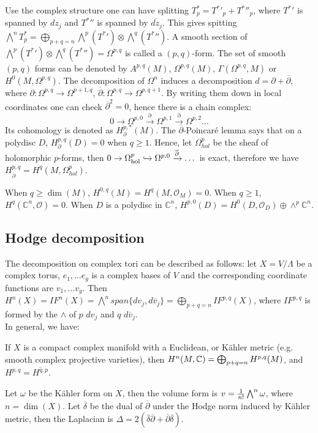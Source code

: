 Use the complex structure one can have splitting $T^*_p={T^*}'_p+{T^*}{''}_p$, where ${T^*}'$ is spanned by $dz_j$ and ${T^*}{''}$ is spanned by $\overline{dz_j}$. This gives spitting $\bigwedge^nT^*_p=\bigoplus_{p+q=n}\bigwedge^p({T^*}')\otimes \bigwedge^q({T^*}{''})$. A smooth section of $\bigwedge^p({T^*}')\otimes \bigwedge^q({T^*}{''})=\Omega^{p,q}$ is called a $(p,q)$-form. The set of smooth $(p,q)$ forms can be denoted by $A^{p,q}(M)$, $\Omega^{p,q}(M)$, $\Gamma(\Omega^{p,q},M)$ or $H^0(M,\Omega^{p,q})$. The decomposition of $\Omega^n$ induces a decomposition $d=\partial+\overline{\partial}$, where $\partial: \Omega^{p,q}\rightarrow\Omega^{p+1,q}$, $\overline{\partial}:\Omega^{p,q}\rightarrow\Omega^{p,q+1}$. By writing them down in local coordinates one can check $\overline{\partial}^2=0$, hence there is a chain complex:
$$0\rightarrow\Omega^{p,0}\xrightarrow{\partial}\Omega^{p,1}\xrightarrow{\partial}\Omega^{p,2}\dots$$
Its cohomology is denoted as $H^{p,*}_\partial(M)$. 
The $\overline{\partial}$-Poincar\'e lemma says that on a polydisc $D$, $H^{p,q}_\partial(D)=0$ when $q\geq 1$. Hence, let $\Omega^p_{hol}$ be the sheaf of holomorphic $p$-forms, then $0 \rightarrow\Omega^p_{\rm hol} \xhookrightarrow{}\Omega^{p,0} \xrightarrow{\overline{\partial}}\dots$ is exact, therefore we have $H^{p,q}_{\overline{\partial}}=H^q(M,\Omega^p_{hol})$. \\

\begin{example}
When $q\geq\dim(M)$, $H^{0,q}(M)=H^q(M,\mathcal{O}_M)=0$. When $q\geq 1$, $H^q(\mathbb{C}^n,\mathcal{O})=0$. When $D$ is a polydisc in $\mathbb{C}^n$, $H^{p,0}(D)=H^0(D,\mathcal{O}_D)\oplus\wedge^p\mathbb{C}^n$. 	
\end{example}

\subsection{Hodge decomposition}
The decomposition on complex tori can be described as follows: let $X=V/\Lambda$ be a complex torus, $e_1,\dots e_g$ is a complex bases of $V$ and the corresponding coordinate functions are $v_1,\dots v_g$. Then $H^n(X)=IF^n(X)=\bigwedge^n span\{dv_j,d\overline{v}_j\}=\bigoplus_{p+q=n}IF^{p,q}(X)$, where $IF^{p,q}$ is formed by the $\wedge$ of $p$ $dv_j$ and $q$ $d\overline{v}_j$.\\
 
In general, we have: 
\begin{theorem}
	If $X$ is a compact complex manifold with a Euclidean, or K\"ahler metric (e.g. smooth complex projective varieties), then $H^n(M , {\mathbb C})=\bigoplus_{p+q=n}H^{p,q}(M)$, and $H^{p,q}=\overline{H^{q,p}}$.
\end{theorem}

Let $\omega$ be the K\"ahler form on $X$, then the volume form is $v={1\over n!}\bigwedge^n\omega$, where $n=\dim(X)$. Let $\overline{\delta}$ be the dual of $\overline{\partial}$ under the Hodge norm induced by K\"ahler metric, then the Laplacian is $\Delta=2(\overline{\delta}\overline{\partial}+\overline{\partial}\overline{\delta})$.